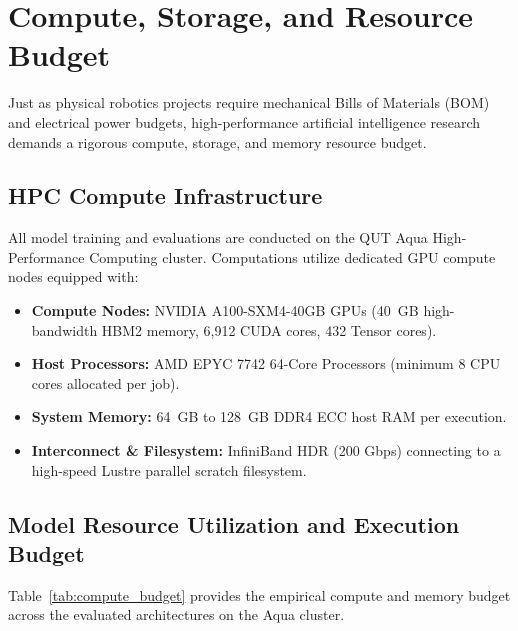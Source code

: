 \section{Compute, Storage, and Resource Budget}
\label{sec:compute_budget}
Just as physical robotics projects require mechanical Bills of Materials (BOM) and electrical power budgets, high-performance artificial intelligence research demands a rigorous compute, storage, and memory resource budget.

\subsection{HPC Compute Infrastructure}
All model training and evaluations are conducted on the QUT Aqua High-Performance Computing cluster. Computations utilize dedicated GPU compute nodes equipped with:
\begin{itemize}
    \item \textbf{Compute Nodes:} NVIDIA A100-SXM4-40GB GPUs (40~GB high-bandwidth HBM2 memory, 6,912 CUDA cores, 432 Tensor cores).
    \item \textbf{Host Processors:} AMD EPYC 7742 64-Core Processors (minimum 8 CPU cores allocated per job).
    \item \textbf{System Memory:} 64~GB to 128~GB DDR4 ECC host RAM per execution.
    \item \textbf{Interconnect \& Filesystem:} InfiniBand HDR (200 Gbps) connecting to a high-speed Lustre parallel scratch filesystem.
\end{itemize}

\subsection{Model Resource Utilization and Execution Budget}
Table~\ref{tab:compute_budget} provides the empirical compute and memory budget across the evaluated architectures on the Aqua cluster.

